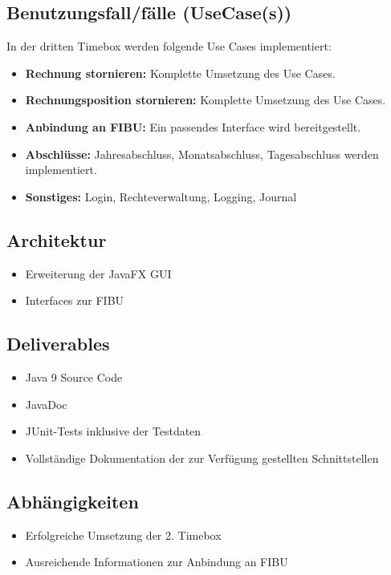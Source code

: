 \documentclass[../Pflichtenheft.tex]{subfiles}
\begin{document}
    \subsection{Benutzungsfall/fälle (UseCase(s)) }
    In der dritten Timebox werden folgende Use Cases implementiert:
    \begin{itemize}
        \item \textbf{Rechnung stornieren: } Komplette Umsetzung des Use Cases.
        \item \textbf{Rechnungsposition stornieren: } Komplette Umsetzung des Use Cases.
        \item \textbf{Anbindung an FIBU: } Ein passendes Interface wird bereitgestellt.
        \item \textbf{Abschlüsse: } Jahresabschluss, Monatsabschluss, Tagesabschluss werden implementiert.
        \item \textbf{Sonstiges: } Login, Rechteverwaltung, Logging, Journal
    \end{itemize}
    \subsection{Architektur}
    \begin{itemize}
        \item Erweiterung der JavaFX GUI
        \item Interfaces zur FIBU
    \end{itemize}
    \subsection{Deliverables}
    \begin{itemize}
        \item Java 9 Source Code
        \item JavaDoc
        \item JUnit-Tests inklusive der Testdaten
        \item Vollständige Dokumentation der zur Verfügung gestellten Schnittstellen
    \end{itemize}
    \subsection{Abhängigkeiten}
    \begin{itemize}
        \item Erfolgreiche Umsetzung der 2. Timebox
        \item Ausreichende Informationen zur Anbindung an FIBU
    \end{itemize}
\end{document}
